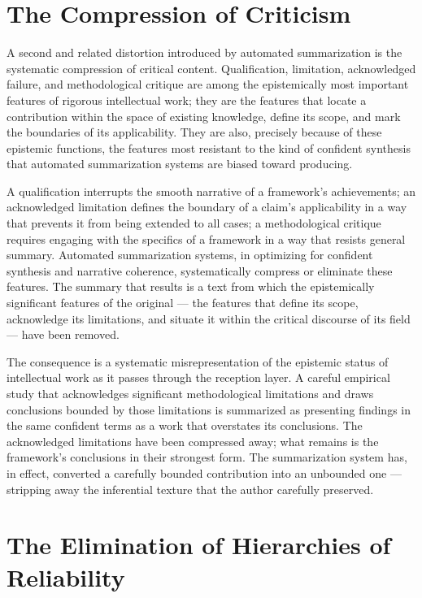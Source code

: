 \documentclass[12pt, openright, twoside]{book}
\begin{document}
\section{The Compression of Criticism}

A second and related distortion introduced by
automated summarization is the systematic
compression of critical content. Qualification,
limitation, acknowledged failure, and
methodological critique are among the
epistemically most important features of
rigorous intellectual work; they are the
features that locate a contribution within
the space of existing knowledge, define its
scope, and mark the boundaries of its
applicability. They are also, precisely because
of these epistemic functions, the features
most resistant to the kind of confident
synthesis that automated summarization systems
are biased toward producing.

A qualification interrupts the smooth narrative
of a framework's achievements; an acknowledged
limitation defines the boundary of a claim's
applicability in a way that prevents it from
being extended to all cases; a methodological
critique requires engaging with the specifics
of a framework in a way that resists general
summary. Automated summarization systems,
in optimizing for confident synthesis and
narrative coherence, systematically compress
or eliminate these features. The summary
that results is a text from which the
epistemically significant features of the
original --- the features that define its
scope, acknowledge its limitations, and
situate it within the critical discourse
of its field --- have been removed.

The consequence is a systematic misrepresentation
of the epistemic status of intellectual work
as it passes through the reception layer.
A careful empirical study that acknowledges
significant methodological limitations and
draws conclusions bounded by those limitations
is summarized as presenting findings in the
same confident terms as a work that overstates
its conclusions. The acknowledged limitations
have been compressed away; what remains is
the framework's conclusions in their strongest
form. The summarization system has, in effect,
converted a carefully bounded contribution
into an unbounded one --- stripping away
the inferential texture that the author
carefully preserved.

\section{The Elimination of Hierarchies of Reliability}
\end{document}
